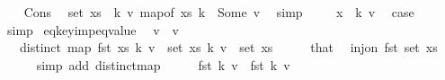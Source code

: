 \begin{isabellebody}
\ \ \isamarkupfalse%
\ Cons\ \isamarkupfalse%
\ {\isachardoublequoteopen}set\ xs\ {\isacharequal}{\kern0pt}\ {\isacharbraceleft}{\kern0pt}{\isacharparenleft}{\kern0pt}k{\isacharcomma}{\kern0pt}\ v{\isacharparenright}{\kern0pt}{\isachardot}{\kern0pt}\ map{\isacharunderscore}{\kern0pt}of\ xs\ k\ {\isacharequal}{\kern0pt}\ Some\ v{\isacharbraceright}{\kern0pt}{\isachardoublequoteclose}\ \isamarkupfalse%
\ simp\isanewline
\ \ \isamarkupfalse%
\ {\isacharasterisk}{\kern0pt}\ {\isacartoucheopen}x\ {\isacharequal}{\kern0pt}\ {\isacharparenleft}{\kern0pt}k{\isacharcomma}{\kern0pt}\ v{\isacharparenright}{\kern0pt}{\isacartoucheclose}\ \isamarkupfalse%
\ {\isacharquery}{\kern0pt}case\ \isamarkupfalse%
\ simp\isanewline
{}\isamarkupfalse%
%
\endisatagproof
{\isafoldproof}%
%
\isadelimproof
\isanewline
%
\endisadelimproof
\isanewline
{}\isamarkupfalse%
\ eq{\isacharunderscore}{\kern0pt}key{\isacharunderscore}{\kern0pt}imp{\isacharunderscore}{\kern0pt}eq{\isacharunderscore}{\kern0pt}value{\isacharcolon}{\kern0pt}\isanewline
\ \ {\isachardoublequoteopen}v{}\ {\isacharequal}{\kern0pt}\ v{}{\isachardoublequoteclose}\isanewline
\ \ \ {\isachardoublequoteopen}distinct\ {\isacharparenleft}{\kern0pt}map\ fst\ xs{\isacharparenright}{\kern0pt}{\isachardoublequoteclose}\ {\isachardoublequoteopen}{\isacharparenleft}{\kern0pt}k{\isacharcomma}{\kern0pt}\ v{}{\isacharparenright}{\kern0pt}\ {\isasymin}\ set\ xs{\isachardoublequoteclose}\ {\isachardoublequoteopen}{\isacharparenleft}{\kern0pt}k{\isacharcomma}{\kern0pt}\ v{}{\isacharparenright}{\kern0pt}\ {\isasymin}\ set\ xs{\isachardoublequoteclose}\isanewline
%
\isadelimproof
%
\endisadelimproof
%
\isatagproof
{}\isamarkupfalse%
\ {\isacharminus}{\kern0pt}\isanewline
\ \ \isamarkupfalse%
\ that\ \isamarkupfalse%
\ {\isachardoublequoteopen}inj{\isacharunderscore}{\kern0pt}on\ fst\ {\isacharparenleft}{\kern0pt}set\ xs{\isacharparenright}{\kern0pt}{\isachardoublequoteclose}\isanewline
\ \ \ \ \isamarkupfalse%
\ {\isacharparenleft}{\kern0pt}simp\ add{\isacharcolon}{\kern0pt}\ distinct{\isacharunderscore}{\kern0pt}map{\isacharparenright}{\kern0pt}\isanewline
\ \ \isamarkupfalse%
\ \isamarkupfalse%
\ {\isachardoublequoteopen}fst\ {\isacharparenleft}{\kern0pt}k{\isacharcomma}{\kern0pt}\ v{}{\isacharparenright}{\kern0pt}\ {\isacharequal}{\kern0pt}\ fst\ {\isacharparenleft}{\kern0pt}k{\isacharcomma}{\kern0pt}\ v{}{\isacharparenright}{\kern0pt}{\isachardoublequoteclose}\isanewline

\end{isabellebody}

